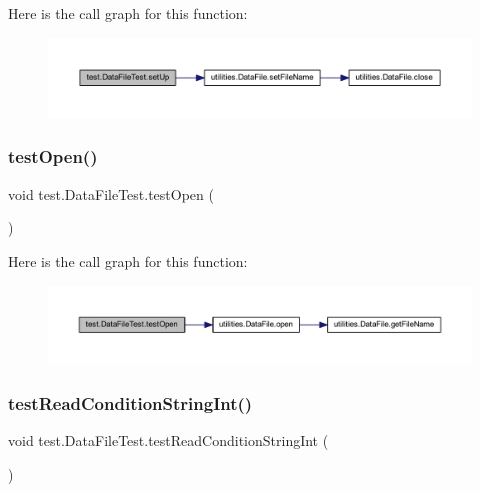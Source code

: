 Here is the call graph for this function\+:\nopagebreak
\begin{figure}[H]
\begin{center}
\leavevmode
\includegraphics[width=350pt]{classtest_1_1_data_file_test_a0c4aa82f4822e250fa2ea1d238f25f87_cgraph}
\end{center}
\end{figure}
\mbox{\label{classtest_1_1_data_file_test_aa7338ead543ecd8b09f2a0d5a93c3ee8}} 
\subsubsection{\texorpdfstring{test\+Open()}{testOpen()}}
{\footnotesize\ttfamily void test.\+Data\+File\+Test.\+test\+Open (\begin{DoxyParamCaption}{ }\end{DoxyParamCaption})}

Here is the call graph for this function\+:\nopagebreak
\begin{figure}[H]
\begin{center}
\leavevmode
\includegraphics[width=350pt]{classtest_1_1_data_file_test_aa7338ead543ecd8b09f2a0d5a93c3ee8_cgraph}
\end{center}
\end{figure}
\mbox{\label{classtest_1_1_data_file_test_afceb03fbe887feb7c9c51074ea1c41d8}} 
\subsubsection{\texorpdfstring{test\+Read\+Condition\+String\+Int()}{testReadConditionStringInt()}}
{\footnotesize\ttfamily void test.\+Data\+File\+Test.\+test\+Read\+Condition\+String\+Int (\begin{DoxyParamCaption}{ }\end{DoxyParamCaption})}

